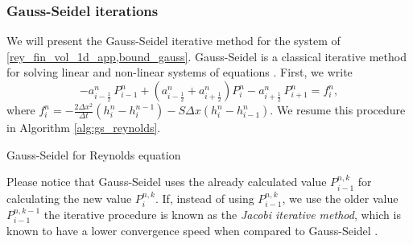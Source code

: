 \subsubsection*{Gauss-Seidel iterations}
We will present the Gauss-Seidel iterative method for the system of \eqref{rey_fin_vol_1d_app,bound_gauss}. Gauss-Seidel is a classical iterative method for solving linear and non-linear systems of equations \cite{golub1996,ausas07,profito2015}. First, we write
\begin{equation}
-a^n_{i-\frac{1}{2}}\,P^n_{i-1}+
\left(a^n_{i-\frac{1}{2}}+a^n_{i+\frac{1}{2}}\right)P^n_i-a^n_{i+\frac{1}{2}}\,P^n_{i+1}=f^n_i,
\end{equation}
where $f^n_i=-\frac{2\Delta x ^2}{\Delta t}\left(h_{i}^{n}-h_{i}^{n-1}\right)-S\Delta x\left(h_i^n-h_{i-1}^n\right)$. We resume this procedure in Algorithm \ref{alg:gs_reynolds}.

\begin{algorithm}[ht]\small
\caption{Gauss-Seidel for Reynolds equation}
\LinesNumbered
{}
\label{alg:gs_reynolds}
\end{algorithm}

Please notice that Gauss-Seidel uses the already calculated value $P_{i-1}^{n,k}$ for calculating the new value $P_i^{n,k}$. If, instead of using $P_{i-1}^{n,k}$, we use the older value $P_{i-1}^{n,k-1}$ the iterative procedure is known as the \emph{Jacobi iterative method}, which is known to have a lower convergence speed when compared to Gauss-Seidel \cite{golub1996}.


